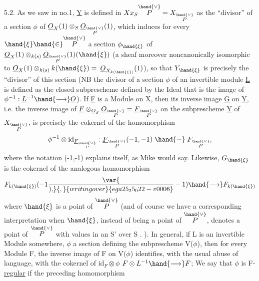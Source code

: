 5.2. As we saw in no.1, \underline{Y} is defined in $X x_S \overset{\hand{\vee}}{P} = X_{\overset{\hand{\vee}}{P}}$
as the “divisor” of a section $\phi$ of $\underline{O}_X(1)\otimes_S \underline{O}_{\overset{\hand{\vee}}{P}}(1)$, which induces for
every $\hand{\xi} \hand{\in} \overset{\hand{\vee}}{P}$ a section $\phi_{\hand{\xi}}$ of  $\underline{O}_X(1)\otimes_{k(s)}\underline{O}_{\overset{\hand{\vee}}{P}}(1)(\hand{\xi})$
(a sheaf moreover noncanonically isomorphic to $\underline{O}_X(1)\otimes_{k(s)}k(\hand{\xi}) =$
$\underline{O}_{X_{k(\hand{\xi})}}(1)$), so that $Y_{\hand{\xi}}$ is precisely the  “divisor” of
this section (NB the divisor of a section $\phi$ of an invertible module \underline{L} 
is defined as the closed subprescheme defined by the Ideal that is the image of
$\phi^{-1} : \underline{L}^{-1} \hand{\longrightarrow} \underline{O}$). If \underline{F} is a Module on X, then its inverse image \underline{G}
on \underline{Y}, i.e. the inverse image of $\underline{F}\otimes_{\underline{O}_S}\underline{O}_{\overset{\hand{\vee}}{P}} = \underline{F}_{\overset{\hand{\vee}}{P}}$ on the subprescheme \underline{Y} of
$X_{\overset{\hand{\vee}}{P}}$, is precisely the cokernel of the homomorphism
\[ \phi^{-1}\otimes \mathrm{id}_{\underline{F}_{\overset{\hand{\vee}}{P}}} : \underline{F}_{\overset{\hand{\vee}}{P}}(-1,-1) \mathrel{\hand{-}} F_{\overset{\hand{\vee}}{P}} , \]
where the notation (-1,-1) explains itself, as Mike would say. Likewise,
$G_{\hand{\xi}}$ is the cokernel of the analogous homomorphism
\[ F_{k(\hand{\xi})}(-1\var{\over{)}{,}}{,}{writing over}{ega25_25_022-v0006}-1) \hand{\longrightarrow} F_{k(\hand{\xi})} \]
where $\hand{\xi}$ is a point of $\overset{\hand{\vee}}{P}$ (and of course we have a corresponding
interpretation when $\hand{\xi}$, instead of being a point of $\overset{\hand{\vee}}{P}$, denotes a point
of $\overset{\hand{\vee}}{P}$ with values in an S' over S . ). \hand{\unsure{(}}In general, if L is an
invertible Module somewhere, $\phi$ a section defining the subprescheme
V($\phi$), then for every Module F, the inverse image of F on V($\phi$)
identifies, with the usual abuse of language, with the cokernel of $\mathrm{id}_F\otimes\phi$
$F\otimes L^{-1} \hand{\longrightarrow} F$; We say that $\phi$ is F-\uline{regular} if the preceding homomorphism
